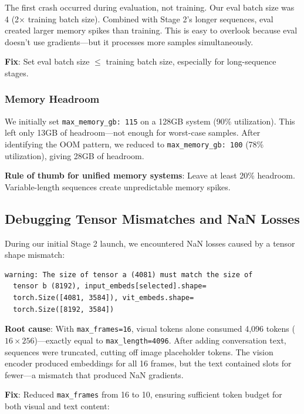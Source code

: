 \documentclass[11pt,a4paper]{article}
\begin{document}
\begin{keyinsight}
The first crash occurred during evaluation, not training. Our eval batch size was 4 (2$\times$ training batch size). Combined with Stage 2's longer sequences, eval created larger memory spikes than training. This is easy to overlook because eval doesn't use gradients---but it processes more samples simultaneously.
\end{keyinsight}

\textbf{Fix}: Set eval batch size $\leq$ training batch size, especially for long-sequence stages.

\subsubsection{Memory Headroom}

We initially set \texttt{max\_memory\_gb: 115} on a 128GB system (90\% utilization). This left only 13GB of headroom---not enough for worst-case samples. After identifying the OOM pattern, we reduced to \texttt{max\_memory\_gb: 100} (78\% utilization), giving 28GB of headroom.

\textbf{Rule of thumb for unified memory systems}: Leave at least 20\% headroom. Variable-length sequences create unpredictable memory spikes.

\subsection{Debugging Tensor Mismatches and NaN Losses}

During our initial Stage 2 launch, we encountered NaN losses caused by a tensor shape mismatch:

\begin{lstlisting}[caption=The NaN-causing tensor mismatch warning]
warning: The size of tensor a (4081) must match the size of 
  tensor b (8192), input_embeds[selected].shape=
  torch.Size([4081, 3584]), vit_embeds.shape=
  torch.Size([8192, 3584])
\end{lstlisting}

\textbf{Root cause}: With \texttt{max\_frames=16}, visual tokens alone consumed 4,096 tokens ($16 \times 256$)---exactly equal to \texttt{max\_length=4096}. After adding conversation text, sequences were truncated, cutting off image placeholder tokens. The vision encoder produced embeddings for all 16 frames, but the text contained slots for fewer---a mismatch that produced NaN gradients.

\textbf{Fix}: Reduced \texttt{max\_frames} from 16 to 10, ensuring sufficient token budget for both visual and text content:
\end{document}
